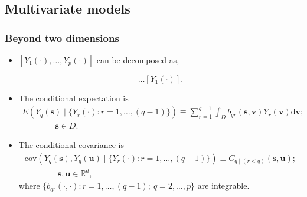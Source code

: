 \documentclass{beamer}
\newcommand{\intd} {\mathrm{d}}
\newcommand{\svec} {\textbf{s}}
\newcommand{\uvec} {\textbf{u}}
\renewcommand{\v}{\mathbf{v}}
\newcommand{\E}{E}
\newcommand{\cov}{\mathrm{cov}}
\begin{document}

\subsection{Multivariate models}

\begin{frame}
\frametitle{Beyond two dimensions}

\begin{itemize}
\item  $[Y_1(\cdot),\dots,Y_p(\cdot)]$ can be decomposed as,

\begin{equation*}
[Y_p(\cdot) \mid  Y_{p-1}(\cdot),Y_{p-2}(\cdot),\dots,Y_1(\cdot)]\dots [Y_1(\cdot)].                  \end{equation*} \pause

\item The conditional expectation is
\begin{align*}
\E(Y_q(\svec) \mid  \{Y_r(\cdot) : r = 1,\dots,(q-1)\}) \equiv \sum_{r = 1}^{q-1} \int_D b_{qr}(\svec,\v)Y_r(\v) \intd \v; \\
 \qquad \qquad \svec \in D.
\end{align*} \pause

\item The conditional covariance is
\begin{align*}
\cov(Y_q(\svec), Y_q(\uvec) \mid  \{Y_r(\cdot) : r = 1,\dots,(q-1)\}) \equiv C_{q \mid  (r < q)}(\svec,\uvec);\\  \qquad\qquad \svec,\uvec \in \mathbb{R}^d,
\end{align*}
where $\{b_{qr}(\cdot,\cdot) : r = 1,\dots,(q-1) ;~q = 2,\dots,p\}$ are integrable.

\end{itemize}
\end{frame}

\end{document}
